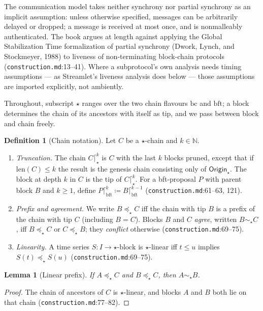 \documentclass[11pt,a4paper]{article}
\newtheorem{lemma}[theorem]{Lemma}
\theoremstyle{definition}
\newtheorem{definition}[theorem]{Definition}
\newcommand{\N}{\mathbb{N}}
\begin{document}
The communication model takes neither synchrony nor partial synchrony as
an implicit assumption: unless otherwise specified, messages can be
arbitrarily delayed or dropped; a message is received at most once, and is
nonmalleably authenticated. The book argues at length against applying the
Global Stabilization Time formalization of partial synchrony (Dwork,
Lynch, and Stockmeyer, 1988) to liveness of non-terminating block-chain
protocols (\texttt{construction.md}:13--41). Where a subprotocol's own
analysis needs timing assumptions --- as Streamlet's liveness analysis
does below --- those assumptions are imported explicitly, not ambiently.

Throughout, subscript $\star$ ranges over the two chain flavours
$\mathrm{bc}$ and $\mathrm{bft}$; a block determines the chain of its
ancestors with itself as tip, and we pass between block and chain freely.

\begin{definition}[Chain notation]\label{def:xl-notation}
Let $C$ be a $\star$-chain and $k \in \N$.
\begin{enumerate}[label=(\roman*)]
\item \emph{Truncation.} The chain $C \lceil^{k}_{\star}$ is $C$ with the
  last $k$ blocks pruned, except that if $\mathrm{len}(C) \le k$ the
  result is the genesis chain consisting only of
  $\mathsf{Origin}_{\star}$. The block at depth $k$ in $C$ is the tip of
  $C \lceil^{k}_{\star}$. For a bft-proposal $P$ with parent block $B$ and
  $k \ge 1$, define $P \lceil^{k}_{\mathrm{bft}} \coloneqq B
  \lceil^{k-1}_{\mathrm{bft}}$
  (\texttt{construction.md}:61--63, 121).
\item \emph{Prefix and agreement.} We write $B \preceq_{\star} C$ iff the
  chain with tip $B$ is a prefix of the chain with tip $C$ (including $B =
  C$). Blocks $B$ and $C$ \emph{agree}, written $B \sim_{\star} C$, iff $B
  \preceq_{\star} C$ or $C \preceq_{\star} B$; they \emph{conflict}
  otherwise (\texttt{construction.md}:69--75).
\item \emph{Linearity.} A time series $S : I \to
  \text{$\star$-block}$ is $\star$-linear iff $t \le u$ implies $S(t)
  \preceq_{\star} S(u)$ (\texttt{construction.md}:69--75).
\end{enumerate}
\end{definition}

\begin{lemma}[Linear prefix]\label{lem:xl-linear-prefix}
If $A \preceq_{\star} C$ and $B \preceq_{\star} C$, then $A \sim_{\star}
B$.
\end{lemma}
\begin{proof}
The chain of ancestors of $C$ is $\star$-linear, and blocks $A$ and $B$
both lie on that chain (\texttt{construction.md}:77--82).
\end{proof}
\end{document}
